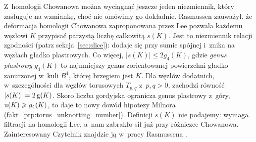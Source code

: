 Z~homologii Chowanowa można wyciągnąć jeszcze jeden niezmiennik, który zasługuje na wzmiankę, choć nie omówimy go dokładnie.
Rasmussen \cite{rasmussen2010} zauważył, że deformacja homologii Chowanowa zaproponowana przez Lee \cite{lee2005} pozwala każdemu węzłowi $K$ przypisać parzystą liczbę całkowitą $s(K)$.
%
%
%
Jest to niezmiennik relacji zgodności (patrz sekcja~\ref{sec:slice}): dodaje się przy sumie spójnej i~znika na węzłach gładko plastrowych.
Co więcej, $|s(K)| \le 2g_4(K)$, gdzie \emph{genus plastrowy} $g_4(K)$ to najmniejszy genus zorientowanej powierzchni gładko zanurzonej w~kuli $B^4$, której brzegiem jest $K$.
%
Dla węzłów dodatnich, w~szczególności dla węzłów torusowych $T_{p, q}$ z~$p, q > 0$, zachodzi równość $|s(K)| = 2\operatorname{g}(K)$.
Skoro liczba gordyjska ogranicza genus plastrowy z~góry, $\operatorname{u}(K) \geqslant g_4(K)$, to daje to nowy dowód hipotezy Milnora (fakt~\ref{prp:torus_unknotting_number}).
Definicji $s(K)$ nie podajemy: wymaga filtracji na homologii Lee, a~nam zabrakło sił już przy różniczce Chowanowa.
Zainteresowany Czytelnik znajdzie ją w~pracy Rasmussena \cite{rasmussen2010}.


